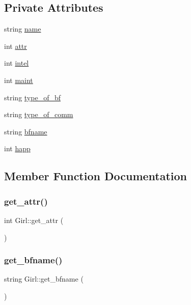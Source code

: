 \subsection*{Private Attributes}
\begin{DoxyCompactItemize}
\item 
string \hyperlink{classGirl_ace47c55f2f3bc3237f6acba40302b442}{name}
\item 
int \hyperlink{classGirl_a136078d5111d5dc1fef6a35f84b38c01}{attr}
\item 
int \hyperlink{classGirl_aa080458d52c82d5ac19c323a579e3a82}{intel}
\item 
int \hyperlink{classGirl_a60974d0ff5dd6b48e9ec951b2ee3e242}{maint}
\item 
string \hyperlink{classGirl_a28d82cc4c1dca641f98600f3ae2ead63}{type\+\_\+of\+\_\+bf}
\item 
string \hyperlink{classGirl_ad1688de7d21b7c60292f4e7716a4653d}{type\+\_\+of\+\_\+comm}
\item 
string \hyperlink{classGirl_a9879d5b627e9f64ea139673c0c48e726}{bfname}
\item 
int \hyperlink{classGirl_a2ee18ed2f7e67fad894784f366479897}{happ}
\end{DoxyCompactItemize}


\subsection{Member Function Documentation}
\mbox{\label{classGirl_ad85944559b5d1625ca28052ed5724aad}} 
\subsubsection{\texorpdfstring{get\+\_\+attr()}{get\_attr()}}
{\footnotesize\ttfamily int Girl\+::get\+\_\+attr (\begin{DoxyParamCaption}{ }\end{DoxyParamCaption})}

\mbox{\label{classGirl_adb8f00387cf2873521596573c6ccf40f}} 
\subsubsection{\texorpdfstring{get\+\_\+bfname()}{get\_bfname()}}
{\footnotesize\ttfamily string Girl\+::get\+\_\+bfname (\begin{DoxyParamCaption}{ }\end{DoxyParamCaption})}

